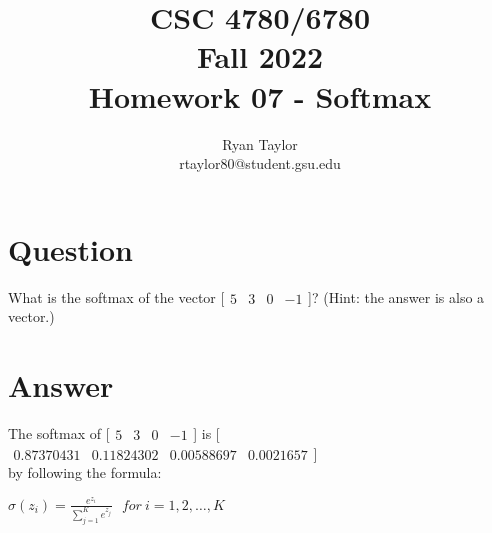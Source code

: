 \documentclass[11pt,english]{article}
\begin{document}
\title{CSC 4780/6780 \\
Fall 2022\\ Homework 07 - Softmax}
\author{Ryan Taylor \\ rtaylor80@student.gsu.edu}
\maketitle

\section{Question}

What is the softmax of the vector [$\begin{array}{cccc} 5 & 3 & 0 & -1 \end{array}$]? (Hint: the answer is also a vector.)

\section{Answer}

The softmax of [$\begin{array}{cccc} 5 & 3 & 0 & -1 \end{array}$] is [$\begin{array}{cccc} 0.87370431 & 0.11824302 & 0.00588697 & 0.0021657 \end{array}$] \\
by following the formula:

$\sigma(z_i) = \frac{e^{z_{i}}}{\sum_{j=1}^K e^{z_{j}}} \ \ \ for\ i=1,2,\dots,K$
\end{document}
